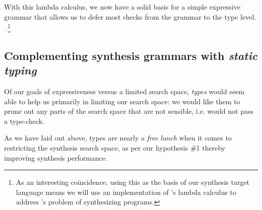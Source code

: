 \documentclass{article}
\begin{document}

With this lambda calculus, we now have a solid basis for a simple expressive grammar that allows us to defer most checks from the grammar to the type level.%
~\footnote{
    As an interesting coincidence,
    using this as the basis of our synthesis target language means
    we will use an implementation of \citet{lambdacalculus}'s lambda calculus
    to address \citet{church1957applications}'s problem of synthesizing programs.
}

\subsection{Complementing synthesis grammars with \emph{static typing}} \label{sec:statictyping}

Of our goals of expressiveness versus a limited search space,
\emph{types} would seem able to help us primarily in limiting our search space:
we would like them to prune out any parts of the search space that are not sensible,
i.e. would not pass a type-check.

As we have laid out above,
types are nearly a \emph{free lunch} when it comes to restricting the synthesis search space,
as per our hypothesis \#1
thereby improving synthesis performance.
\end{document}
